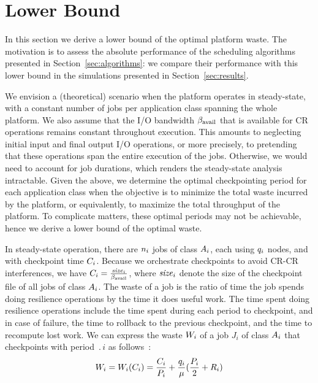 
\section{Lower Bound}
\label{sec:lowerbound}

In this section we derive a lower bound of the optimal platform waste.
The motivation is to assess the absolute performance of the scheduling
algorithms presented in Section~\ref{sec:algorithms}:
we compare their performance with  this lower bound in the simulations presented in Section~\ref{sec:results}.

We envision a (theoretical) scenario when the platform operates in steady-state,
with a constant number of jobs per application class spanning the whole platform. We also assume that
the I/O bandwidth $\beta_{\text{avail}}$  that is available for CR operations remains constant throughout
execution. This amounts to neglecting initial input and final output I/O operations,
or more precisely, to pretending that these operations span the entire execution of the jobs.
Otherwise, we would need to account for job durations, which renders the
steady-state analysis intractable.
Given the above, we determine the optimal checkpointing period for each application class
when the objective is to minimize the total waste incurred  by the platform, or equivalently,
to maximize the total throughput of the platform. To complicate matters, these optimal periods
may not be achievable,  hence we derive a lower bound of the optimal waste.

In steady-state operation, there are $n_{i}$ jobs of class $A_{i}$,
each using $q_{i}$ nodes, and with checkpoint time $C_{i}$. Because we orchestrate
checkpoints to avoid CR-CR interferences, we have $C_{i} = \frac{\mathit{size}_{i}}{\beta_{\text{avail}}}$,
where $\mathit{size}_{i}$ denote the size of the checkpoint file of all jobs of class $A_{i}$.
The waste of a job is the ratio of time the job spends doing
resilience operations by the time it does useful work. The time spent doing
resilience operations include the time spent during each period to checkpoint,
and in case of failure, the time to rollback to the previous checkpoint, and the
time to recompute lost work.
We
can express the waste $W_{i}$ of a job $J_{i}$ of class
$A_{i}$ that checkpoints with period $\period{i}$
as follows~\cite{springer-monograph}:
\begin{equation}
W_{i} = W_{i}(C_{i}) = \frac{C_{i}}{P_{i}} +
\frac{q_{i}}{\mu}(\frac{P_{i}}{2} + R_{i})
\label{eq.wasteAi}
\end{equation}

